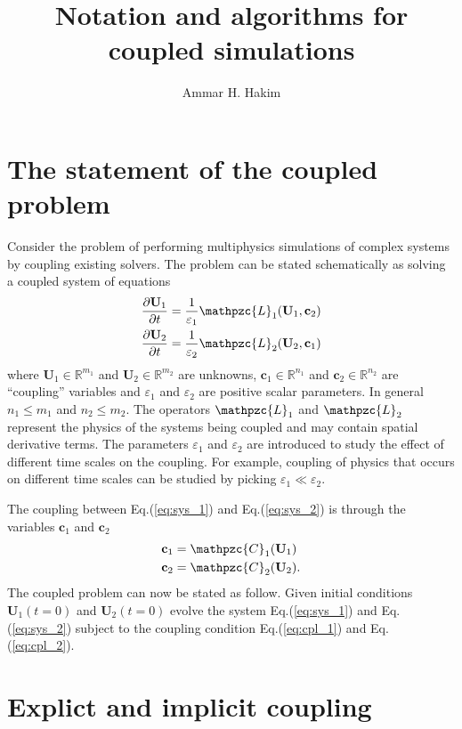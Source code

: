\documentclass[11pt, reqno]{amsart}
\title{Notation and algorithms for coupled simulations}%
\author{Ammar H. Hakim}%
\date{}
\newcommand{\eqr}[1]{Eq.\thinspace(#1)}
\newcommand{\pfrac}[2]{\frac{\partial #1}{\partial #2}}
\newcommand{\mvec}[1]{\mathbf{#1}}
\newcommand{\script}[1]{\mathpzc{#1}}
\theoremstyle{definition}
\begin{document}
\maketitle

\section{The statement of the coupled problem}

Consider the problem of performing multiphysics simulations of complex
systems by coupling existing solvers. The problem can be stated
schematically as solving a coupled system of equations
\begin{align}
  \pfrac{\mvec{U}_1}{t} &= \frac{1}{\varepsilon_1}
  \script{L}_1(\mvec{U}_1, \mvec{c}_2) \label{eq:sys_1} \\
  \pfrac{\mvec{U}_2}{t} &= \frac{1}{\varepsilon_2}
  \script{L}_2(\mvec{U}_2, \mvec{c}_1) \label{eq:sys_2}
\end{align}
where $\mvec{U}_1 \in \mathbb{R}^{m_1}$ and $\mvec{U}_2 \in
\mathbb{R}^{m_2}$ are unknowns, $\mvec{c}_1 \in \mathbb{R}^{n_1}$ and
$\mvec{c}_2 \in \mathbb{R}^{n_2}$ are ``coupling'' variables and
$\varepsilon_1$ and $\varepsilon_2$ are positive scalar parameters. In
general $n_1\le m_1$ and $n_2\le m_2$. The operators $\script{L}_1$
and $\script{L}_2$ represent the physics of the systems being coupled
and may contain spatial derivative terms. The parameters
$\varepsilon_1$ and $\varepsilon_2$ are introduced to study the effect
of different time scales on the coupling. For example, coupling of
physics that occurs on different time scales can be studied by picking
$\varepsilon_1 \ll \varepsilon_2$.

The coupling between \eqr{\ref{eq:sys_1}} and \eqr{\ref{eq:sys_2}} is
through the variables $\mvec{c}_1$ and $\mvec{c}_2$
\begin{align}
  \mvec{c}_1 &= \script{C}_1(\mvec{U}_1) \label{eq:cpl_1} \\
  \mvec{c}_2 &= \script{C}_2(\mvec{U}_2). \label{eq:cpl_2}
\end{align}
The coupled problem can now be stated as follow. Given initial
conditions $\mvec{U}_1(t=0)$ and $\mvec{U}_2(t=0)$ evolve the system
\eqr{\ref{eq:sys_1}} and \eqr{\ref{eq:sys_2}} subject to the coupling
condition \eqr{\ref{eq:cpl_1}} and \eqr{\ref{eq:cpl_2}}.

\section{Explict and implicit coupling}
\end{document}

